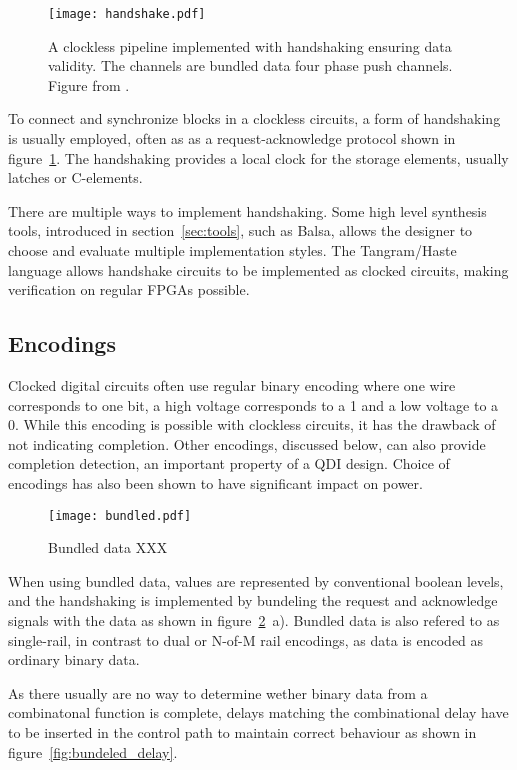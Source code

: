 \begin{figure}[htbp]
  \centering
  \texttt{[image: handshake.pdf]}
  \caption{A clockless pipeline implemented with handshaking ensuring
    data validity. The channels are bundled data four phase push
    channels. Figure from \cite{sparso}.}
  \label{fig:handshake}
\end{figure}

To connect and synchronize blocks in a clockless circuits, a form of
handshaking is usually employed, often as as a request-acknowledge
protocol shown in figure~\ref{fig:handshake}. The handshaking provides
a local clock for the storage elements, usually latches or C-elements.

There are multiple ways to implement handshaking. Some high level
synthesis tools, introduced in section~\ref{sec:tools}, such as Balsa,
allows the designer to choose and evaluate multiple implementation
styles. The Tangram/Haste language allows handshake circuits to be
implemented as clocked circuits, making verification on regular FPGAs
possible.

\subsection{Encodings}

Clocked digital circuits often use regular binary encoding where one
wire corresponds to one bit, a high voltage corresponds to a 1 and a
low voltage to a 0. While this encoding is possible with clockless
circuits, it has the drawback of not indicating completion. Other
encodings, discussed below, can also provide completion detection, an
important property of a QDI design. Choice of encodings has also been
shown to have significant impact on power.
 
\begin{figure}[htbp]
  \centering
  \texttt{[image: bundled.pdf]}
  \caption{Bundled data XXX}
  \label{fig:bundled}
\end{figure}

When using bundled data, values are represented by conventional
boolean levels, and the handshaking is implemented by bundeling the
request and acknowledge signals with the data as shown in
figure~\ref{fig:bundled}~a). Bundled data is also refered to as
single-rail, in contrast to dual or N-of-M rail encodings, as data is
encoded as ordinary binary data.

As there usually are no way to determine wether binary data from a
combinatonal function is complete, delays matching the combinational
delay have to be inserted in the control path to maintain correct
behaviour as shown in figure~\ref{fig:bundeled_delay}.

